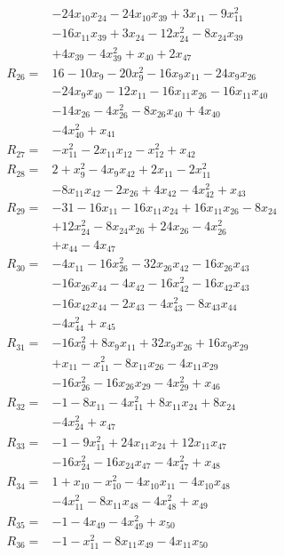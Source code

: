 \begin{align*}
&-24x_{10}x_{24} -24x_{10}x_{39} +3x_{11} -9x_{11}^{2}\\
&-16x_{11}x_{39} +3x_{24} -12x_{24}^{2} -8x_{24}x_{39}\\
&+4x_{39} -4x_{39}^{2} +x_{40} +2x_{47}\\[3pt]
R_{26}={}&16 -10x_{9} -20x_{9}^{2} -16x_{9}x_{11} -24x_{9}x_{26}\\
&-24x_{9}x_{40} -12x_{11} -16x_{11}x_{26} -16x_{11}x_{40}\\
&-14x_{26} -4x_{26}^{2} -8x_{26}x_{40} +4x_{40}\\
&-4x_{40}^{2} +x_{41}\\[3pt]
R_{27}={}&-x_{11}^{2} -2x_{11}x_{12} -x_{12}^{2} +x_{42}\\[3pt]
R_{28}={}&2 +x_{9}^{2} -4x_{9}x_{42} +2x_{11} -2x_{11}^{2}\\
&-8x_{11}x_{42} -2x_{26} +4x_{42} -4x_{42}^{2} +x_{43}\\[3pt]
R_{29}={}&-31 -16x_{11} -16x_{11}x_{24} +16x_{11}x_{26} -8x_{24}\\
&+12x_{24}^{2} -8x_{24}x_{26} +24x_{26} -4x_{26}^{2}\\
&+x_{44} -4x_{47}\\[3pt]
R_{30}={}&-4x_{11} -16x_{26}^{2} -32x_{26}x_{42} -16x_{26}x_{43}\\
&-16x_{26}x_{44} -4x_{42} -16x_{42}^{2} -16x_{42}x_{43}\\
&-16x_{42}x_{44} -2x_{43} -4x_{43}^{2} -8x_{43}x_{44}\\
&-4x_{44}^{2} +x_{45}\\[3pt]
R_{31}={}&-16x_{9}^{2} +8x_{9}x_{11} +32x_{9}x_{26} +16x_{9}x_{29}\\
&+x_{11} -x_{11}^{2} -8x_{11}x_{26} -4x_{11}x_{29}\\
&-16x_{26}^{2} -16x_{26}x_{29} -4x_{29}^{2} +x_{46}\\[3pt]
R_{32}={}&-1 -8x_{11} -4x_{11}^{2} +8x_{11}x_{24} +8x_{24}\\
&-4x_{24}^{2} +x_{47}\\[3pt]
R_{33}={}&-1 -9x_{11}^{2} +24x_{11}x_{24} +12x_{11}x_{47}\\
&-16x_{24}^{2} -16x_{24}x_{47} -4x_{47}^{2} +x_{48}\\[3pt]
R_{34}={}&1 +x_{10} -x_{10}^{2} -4x_{10}x_{11} -4x_{10}x_{48}\\
&-4x_{11}^{2} -8x_{11}x_{48} -4x_{48}^{2} +x_{49}\\[3pt]
R_{35}={}&-1 -4x_{49} -4x_{49}^{2} +x_{50}\\[3pt]
R_{36}={}&-1 -x_{11}^{2} -8x_{11}x_{49} -4x_{11}x_{50}\\

\end{align*}
